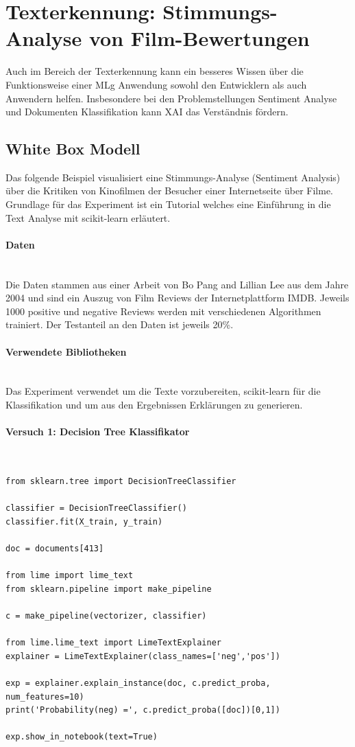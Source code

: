 \documentclass[
  12pt, %
  a4paper, %
  oneside, %
  openany, 
  numbers=noenddot, %
  BCOR=5mm, %
  parskip=half*, %
  thesis, %
]{bfhbook}
\newcommand{\parag}[1]{\paragraph*{#1}\mbox{}\\}
\begin{document}
\section{Texterkennung: Stimmungs-Analyse von Film-Bewertungen}
Auch im Bereich der Texterkennung kann ein besseres Wissen über die Funktionsweise einer \Gls{MLg} Anwendung sowohl den Entwicklern als auch Anwendern helfen. Insbesondere bei den Problemstellungen Sentiment Analyse und Dokumenten Klassifikation kann \Gls{XAI} das Verständnis fördern.

\subsection{White Box Modell}
\label{eli5MovieReview}

Das folgende Beispiel visualisiert eine Stimmungs-Analyse (Sentiment Analysis) über die Kritiken von Kinofilmen der Besucher einer Internetseite über Filme. Grundlage für das Experiment ist ein Tutorial \cite{movieReview} welches eine Einführung in die Text Analyse mit scikit-learn erläutert. 

\parag{Daten}
Die Daten stammen aus einer Arbeit von Bo Pang and Lillian Lee \parencite{Pang+Lee2004} aus dem Jahre 2004 und sind ein Auszug von Film Reviews der Internetplattform IMDB. Jeweils 1000 positive und negative Reviews werden mit verschiedenen Algorithmen trainiert. Der Testanteil an den Daten ist jeweils 20\%.

\parag{Verwendete Bibliotheken}
Das Experiment verwendet \cite{nltk} um die Texte vorzubereiten, scikit-learn \cite{scikit-learnLink} für die Klassifikation und \cite{ELI5} um aus den Ergebnissen Erklärungen zu generieren. 

\parag{Versuch 1: Decision Tree Klassifikator}

\begin{lstlisting}
from sklearn.tree import DecisionTreeClassifier

classifier = DecisionTreeClassifier()
classifier.fit(X_train, y_train)

doc = documents[413]

from lime import lime_text
from sklearn.pipeline import make_pipeline

c = make_pipeline(vectorizer, classifier)

from lime.lime_text import LimeTextExplainer
explainer = LimeTextExplainer(class_names=['neg','pos'])

exp = explainer.explain_instance(doc, c.predict_proba, num_features=10)
print('Probability(neg) =', c.predict_proba([doc])[0,1])

exp.show_in_notebook(text=True) 
\end{lstlisting}
\end{document}
